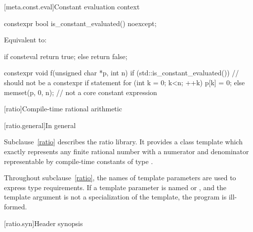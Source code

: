 [meta.const.eval]{Constant evaluation context}
\begin{itemdecl}
constexpr bool is_constant_evaluated() noexcept;
\end{itemdecl}

\begin{itemdescr}
\pnum
\effects
Equivalent to:
\begin{codeblock}
if consteval {
  return true;
} else {
  return false;
}
\end{codeblock}

\pnum
\begin{example}
\begin{codeblock}
constexpr void f(unsigned char *p, int n) {
  if (std::is_constant_evaluated()) {           // should not be a constexpr if statement
    for (int k = 0; k<n; ++k) p[k] = 0;
  } else {
    memset(p, 0, n);                            // not a core constant expression
  }
}
\end{codeblock}
\end{example}
\end{itemdescr}

[ratio]{Compile-time rational arithmetic}

[ratio.general]{In general}

\pnum
{}%
Subclause~\ref{ratio} describes the ratio library. It provides a class template
 which exactly represents any finite rational number with a
numerator and denominator representable by compile-time constants of type
.

\pnum
Throughout subclause~\ref{ratio}, the names of template parameters are used to express
type requirements. If a template parameter is named  or ,
and the template argument is not a specialization of the  template,
the program is ill-formed.

[ratio.syn]{Header  synopsis}

